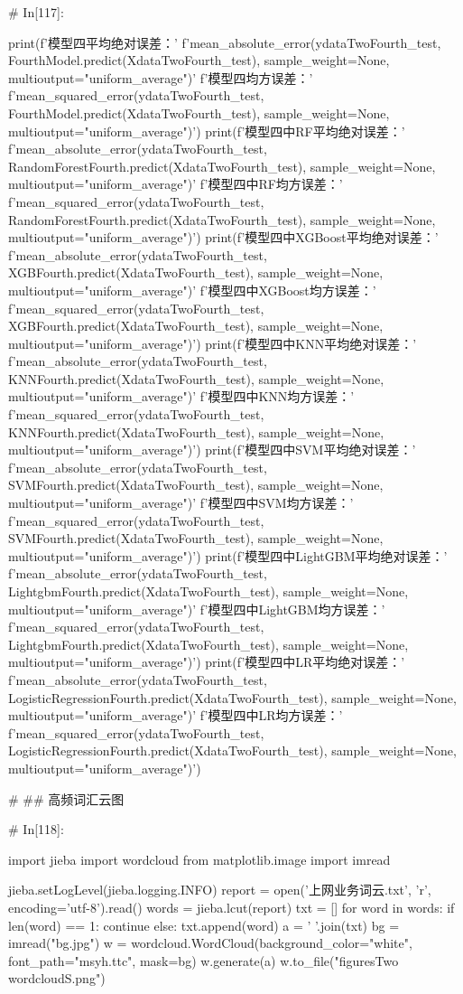 \documentclass{MathorCupmodeling}
\begin{document}
\begin{python}
	# In[117]:
	
	
	print(f'模型四平均绝对误差：'
		  f'{mean_absolute_error(ydataTwoFourth_test, FourthModel.predict(XdataTwoFourth_test), sample_weight=None, multioutput="uniform_average")}\n'
		  f'模型四均方误差：'
		  f'{mean_squared_error(ydataTwoFourth_test, FourthModel.predict(XdataTwoFourth_test), sample_weight=None, multioutput="uniform_average")}')
	print(f'模型四中RF平均绝对误差：'
		  f'{mean_absolute_error(ydataTwoFourth_test, RandomForestFourth.predict(XdataTwoFourth_test), sample_weight=None, multioutput="uniform_average")}\n'
		  f'模型四中RF均方误差：'
		  f'{mean_squared_error(ydataTwoFourth_test, RandomForestFourth.predict(XdataTwoFourth_test), sample_weight=None, multioutput="uniform_average")}')
	print(f'模型四中XGBoost平均绝对误差：'
		  f'{mean_absolute_error(ydataTwoFourth_test, XGBFourth.predict(XdataTwoFourth_test), sample_weight=None, multioutput="uniform_average")}\n'
		  f'模型四中XGBoost均方误差：'
		  f'{mean_squared_error(ydataTwoFourth_test, XGBFourth.predict(XdataTwoFourth_test), sample_weight=None, multioutput="uniform_average")}')
	print(f'模型四中KNN平均绝对误差：'
		  f'{mean_absolute_error(ydataTwoFourth_test, KNNFourth.predict(XdataTwoFourth_test), sample_weight=None, multioutput="uniform_average")}\n'
		  f'模型四中KNN均方误差：'
		  f'{mean_squared_error(ydataTwoFourth_test, KNNFourth.predict(XdataTwoFourth_test), sample_weight=None, multioutput="uniform_average")}')
	print(f'模型四中SVM平均绝对误差：'
		  f'{mean_absolute_error(ydataTwoFourth_test, SVMFourth.predict(XdataTwoFourth_test), sample_weight=None, multioutput="uniform_average")}\n'
		  f'模型四中SVM均方误差：'
		  f'{mean_squared_error(ydataTwoFourth_test, SVMFourth.predict(XdataTwoFourth_test), sample_weight=None, multioutput="uniform_average")}')
	print(f'模型四中LightGBM平均绝对误差：'
		  f'{mean_absolute_error(ydataTwoFourth_test, LightgbmFourth.predict(XdataTwoFourth_test), sample_weight=None, multioutput="uniform_average")}\n'
		  f'模型四中LightGBM均方误差：'
		  f'{mean_squared_error(ydataTwoFourth_test, LightgbmFourth.predict(XdataTwoFourth_test), sample_weight=None, multioutput="uniform_average")}')
	print(f'模型四中LR平均绝对误差：'
		  f'{mean_absolute_error(ydataTwoFourth_test, LogisticRegressionFourth.predict(XdataTwoFourth_test), sample_weight=None, multioutput="uniform_average")}\n'
		  f'模型四中LR均方误差：'
		  f'{mean_squared_error(ydataTwoFourth_test, LogisticRegressionFourth.predict(XdataTwoFourth_test), sample_weight=None, multioutput="uniform_average")}')
	
	# ## 高频词汇云图
	
	# In[118]:
	
	
	import jieba
	import wordcloud
	from matplotlib.image import imread
	
	jieba.setLogLevel(jieba.logging.INFO)
	report = open('上网业务词云.txt', 'r', encoding='utf-8').read()
	words = jieba.lcut(report)
	txt = []
	for word in words:
		if len(word) == 1:
			continue
		else:
			txt.append(word)
	a = ' '.join(txt)
	bg = imread("bg.jpg")
	w = wordcloud.WordCloud(background_color="white", font_path="msyh.ttc", mask=bg)
	w.generate(a)
	w.to_file("figuresTwo\\wordcloudS.png")

\end{python}
\end{document}
